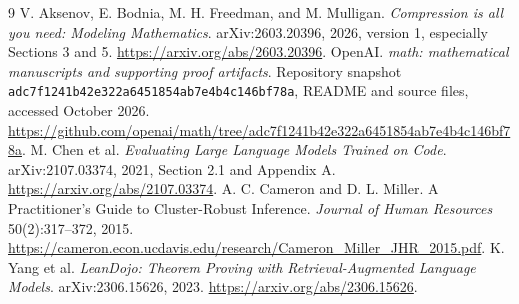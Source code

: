 \documentclass[11pt]{article}
\begin{document}
\begin{thebibliography}{9}
 V. Aksenov, E. Bodnia, M. H. Freedman, and M. Mulligan. \emph{Compression is all you need: Modeling Mathematics}. arXiv:2603.20396, 2026, version 1, especially Sections 3 and 5. \url{https://arxiv.org/abs/2603.20396}.
 OpenAI. \emph{math: mathematical manuscripts and supporting proof artifacts}. Repository snapshot \texttt{adc7f1241b42e322a6451854ab7e4b4c146bf78a}, README and source files, accessed October 2026. \url{https://github.com/openai/math/tree/adc7f1241b42e322a6451854ab7e4b4c146bf78a}.
 M. Chen et al. \emph{Evaluating Large Language Models Trained on Code}. arXiv:2107.03374, 2021, Section 2.1 and Appendix A. \url{https://arxiv.org/abs/2107.03374}.
 A. C. Cameron and D. L. Miller. A Practitioner's Guide to Cluster-Robust Inference. \emph{Journal of Human Resources} 50(2):317--372, 2015. \url{https://cameron.econ.ucdavis.edu/research/Cameron_Miller_JHR_2015.pdf}.
 K. Yang et al. \emph{LeanDojo: Theorem Proving with Retrieval-Augmented Language Models}. arXiv:2306.15626, 2023. \url{https://arxiv.org/abs/2306.15626}.
\end{thebibliography}

\appendix
\end{document}
